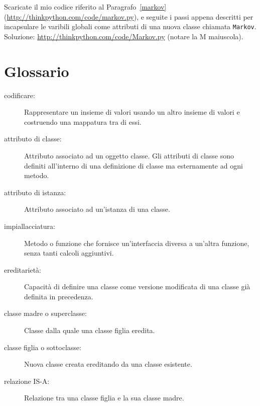 \documentclass[10pt]{book}
\begin{document}
\begin{exercise}

Scaricate il mio codice riferito al Paragrafo~\ref{markov}
(\url{http://thinkpython.com/code/markov.py}), e seguite i passi appena descritti per incapsulare le varibili globali come attributi di una nuova classe chiamata {\tt Markov}.  Soluzione: \url{http://thinkpython.com/code/Markov.py} (notare la M maiuscola).

\end{exercise}




\section{Glossario}

\begin{description}

\item[codificare:]  Rappresentare un insieme di valori usando un altro insieme di valori e costruendo una mappatura tra di essi.

\item[attributo di classe:] Attributo associato ad un oggetto classe. Gli attributi di classe sono definiti all'interno di una definizione di classe ma esternamente ad ogni metodo.

\item[attributo di istanza:] Attributo associato ad un'istanza di una classe.

\item[impiallacciatura:] Metodo o funzione che fornisce un'interfaccia diversa a un'altra funzione, senza tanti calcoli aggiuntivi.

\item[ereditarietà:] Capacità di definire una classe come versione modificata di una classe già definita in precedenza.

\item[classe madre o superclasse:] Classe dalla quale una classe figlia eredita.

\item[classe figlia o sottoclasse:] Nuova classe creata ereditando da una classe esistente.

\item[relazione IS-A:] Relazione tra una classe figlia e la sua classe madre.


\end{description}
\end{document}
